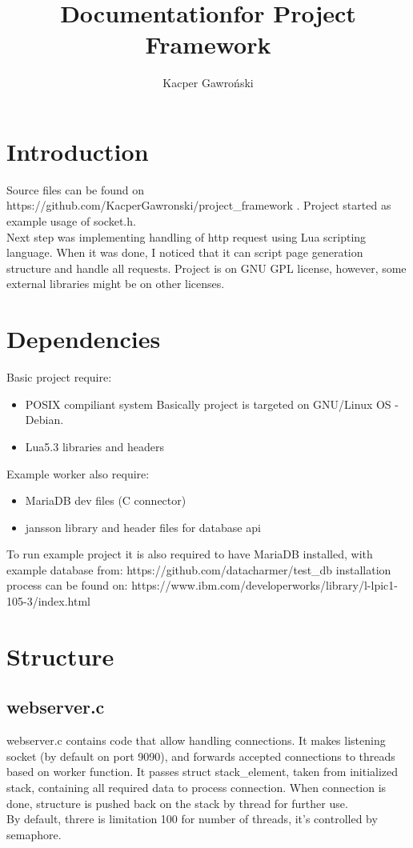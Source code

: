 \documentclass[a4paper]{article}
\title{Documentation\newline for Project Framework}
\author{Kacper Gawroński}
\begin{document}
\maketitle
\section{Introduction}
Source files can be found on https://github.com/KacperGawronski/project\_framework .\newline
Project started as example usage of socket.h.\\
Next step was implementing handling of http request using Lua scripting
language. When it was done, I noticed that it can script page generation
structure and handle all requests. Project is on GNU GPL license, 
however, some external libraries might be on other licenses.
\section{Dependencies}
Basic project require:\\
\begin{itemize}
\item{POSIX compiliant system} Basically project is targeted on GNU/Linux
OS - Debian.
\item{Lua5.3 libraries and headers}
\end{itemize}
Example worker also require:
\begin{itemize}
\item{MariaDB dev files (C connector)}
\item{jansson library and header files} for database api
\end{itemize}
To run example project it is also required to have MariaDB installed,
with example database from:\newline
https://github.com/datacharmer/test\_db\newline
installation process can be found on:\newline
https://www.ibm.com/developerworks/library/l-lpic1-105-3/index.html
\newpage
\section{Structure}
\subsection{webserver.c}
webserver.c contains code that allow handling connections.
It makes listening socket (by default on port 9090), and forwards
accepted connections to threads based on worker function. It passes
struct stack\_element, taken from initialized stack, containing all
required data to process connection. When connection is done, structure
is pushed back on the stack by thread for further use.\\
By default, threre is limitation 100 for number of threads, it's
controlled by semaphore.
\end{document}
